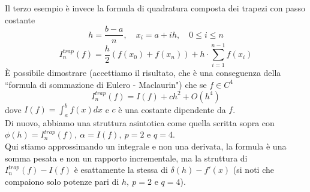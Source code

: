 \documentclass[12pt,a4paper]{article}
\begin{document}
Il terzo esempio è invece la formula di quadratura composta dei trapezi con passo costante
\[
h = \frac{b-a}{n}, \quad x_i = a + ih, \quad 0 \le i \le n
\]
\[
I_n^{trap} (f) = \frac{h}{2} (f(x_0) + f(x_n)) + h \cdot \sum_{i=1}^{n-1} f(x_i)
\]
È possibile dimostrare (accettiamo il risultato, che è una conseguenza della ``formula di sommazione di Eulero - Maclaurin") che se $f \in C^4$
\[
I_n^{trap} (f) = I(f) + ch^2 + O(h^4)
\]
dove $I(f) = \int_a^b f(x) dx$ e $c$ è una costante dipendente da $f$.\\
Di nuovo, abbiamo una struttura asintotica come quella scritta sopra con $\phi (h) = I_n^{trap} (f), \ \alpha = I(f), \ p=2$ e $q=4$.\\
Qui stiamo approssimando un integrale e non una derivata, la formula è una somma pesata e non un rapporto incrementale, ma la struttura di $I_n^{trap} (f) - I(f)$ è esattamente la stessa di $\delta (h) - f'(x)$ (si noti che compaiono solo potenze pari di $h, \ p=2$ e $q=4$).
\end{document}
